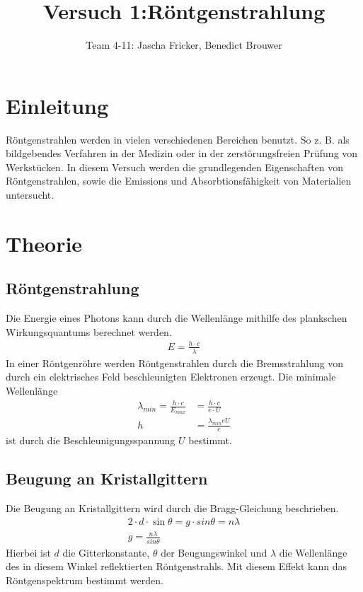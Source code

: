 \documentclass[11pt, a4paper]{article}
\title{Versuch 1:Röntgenstrahlung}
\author{Team 4-11: Jascha Fricker, Benedict Brouwer}
\begin{document}
    \maketitle

    \tableofcontents

    \newpage

    \section{Einleitung}

    Röntgenstrahlen werden in vielen verschiedenen Bereichen benutzt. So z. B. als bildgebendes Verfahren in der Medizin oder in der zerstörungsfreien Prüfung von Werkstücken. In diesem Versuch werden die grundlegenden Eigenschaften von Röntgenstrahlen, sowie die Emissions und Absorbtionsfähigkeit von Materialien untersucht.

    \section{Theorie}

    \subsection{Röntgenstrahlung}

    Die Energie eines Photons kann durch die Wellenlänge mithilfe des plankschen Wirkungsquantums berechnet werden.
    \begin{align}
        E = \frac{h \cdot c}{\lambda}
    \end{align}
    In einer Röntgenröhre werden Röntgenstrahlen durch die Bremsstrahlung von durch ein elektrisches Feld beschleunigten Elektronen erzeugt. Die minimale Wellenlänge
    \begin{align}
        \lambda_{min} = \frac{h \cdot c}{E_{max}} &= \frac{h \cdot c}{e \cdot U} \\
        h &= \frac{\lambda_{min} e U}{c} \label{eq:plank}
    \end{align}
    ist durch die Beschleunigungsspannung $U$ bestimmt.

    \subsection{Beugung an Kristallgittern}

    Die Beugung an Kristallgittern wird durch die Bragg-Gleichung beschrieben.
    \begin{align}
        2 \cdot d \cdot \sin \theta = g \cdot sin \theta = n \lambda \\
        g = \frac{n \lambda}{sin \theta} \label{eq:gitter}
    \end{align}
    Hierbei ist $d$ die Gitterkonstante, $\theta$ der Beugungswinkel und $\lambda$ die Wellenlänge des in diesem Winkel reflektierten Röntgenstrahls. Mit diesem Effekt kann das Röntgenspektrum bestimmt werden.
\end{document}
